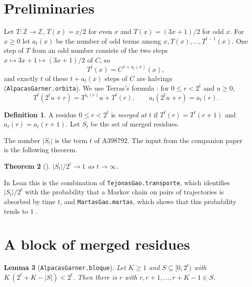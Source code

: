 \documentclass[11pt]{amsart}
\newtheorem{theorem}{Theorem}[section]
\newtheorem{lemma}[theorem]{Lemma}
\theoremstyle{definition}
\newtheorem{definition}[theorem]{Definition}
\theoremstyle{remark}
\newcommand{\Z}{\mathbb{Z}}
\newcommand{\lean}[1]{\nolinkurl{#1}}
\begin{document}
\section{Preliminaries}\label{sec:prelim}

Let $T\colon\Z\to\Z$, $T(x)=x/2$ for even $x$ and $T(x)=(3x+1)/2$ for odd $x$. For $x\ge0$ let $a_t(x)$ be the number of odd terms among $x,T(x),\dots,T^{t-1}(x)$. One step of $T$ from an odd number consists of the two steps $x\mapsto 3x+1\mapsto(3x+1)/2$ of $C$, so
\begin{equation}\label{eq:TC}
T^{t}(x)=C^{\,t+a_t(x)}(x),
\end{equation}
and exactly $t$ of these $t+a_t(x)$ steps of $C$ are halvings (\lean{AlpacasGarner.orbita}). We use Terras's formula \cite{Ter76}: for $0\le r<2^t$ and $u\ge0$,
\begin{equation}\label{eq:terras}
T^{t}(2^tu+r)=3^{a_t(r)}u+T^{t}(r),\qquad a_t(2^tu+r)=a_t(r).
\end{equation}

\begin{definition}
A residue $0\le r<2^t$ is \emph{merged at $t$} if $T^{t}(r)=T^{t}(r+1)$ and $a_t(r)=a_t(r+1)$. Let $S_t$ be the set of merged residues.
\end{definition}

The number $|S_t|$ is the term $t$ of A398792. The input from the companion paper is the following theorem.

\begin{theorem}[{\cite[Corollary~C]{SaidGao}}]\label{thm:gao}
$|S_t|/2^t\to1$ as $t\to\infty$.
\end{theorem}

In Lean this is the combination of \lean{TejonasGao.transporte}, which identifies $|S_t|/2^t$ with the probability that a Markov chain on pairs of trajectories is absorbed by time $t$, and \lean{MartasGao.martas}, which shows that this probability tends to $1$ \cite{SaidGao}.

\section{A block of merged residues}\label{sec:block}

\begin{lemma}[\lean{AlpacasGarner.bloque}]\label{lem:union}
Let $K\ge1$ and $S\subseteq[0,2^t)$ with $K\,(2^t+K-|S|)<2^t$. Then there is $r$ with $r,r+1,\dots,r+K-1\in S$.
\end{lemma}
\end{document}
